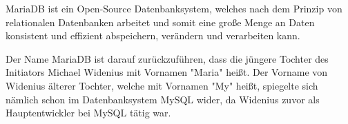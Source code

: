 
MariaDB ist ein Open-Source Datenbanksystem, welches nach dem Prinzip von relationalen Datenbanken arbeitet und somit eine große Menge an Daten konsistent und effizient abspeichern, verändern und verarbeiten kann. \cite{MariaWiki}

Der Name MariaDB ist darauf zurückzuführen, dass die jüngere Tochter des Initiators Michael Widenius mit Vornamen "Maria" heißt. Der Vorname von Widenius älterer Tochter, welche mit Vornamen "My" heißt, spiegelte sich nämlich schon im Datenbanksystem MySQL wider, da Widenius zuvor als Hauptentwickler bei MySQL tätig war. \cite{MariaWiki}